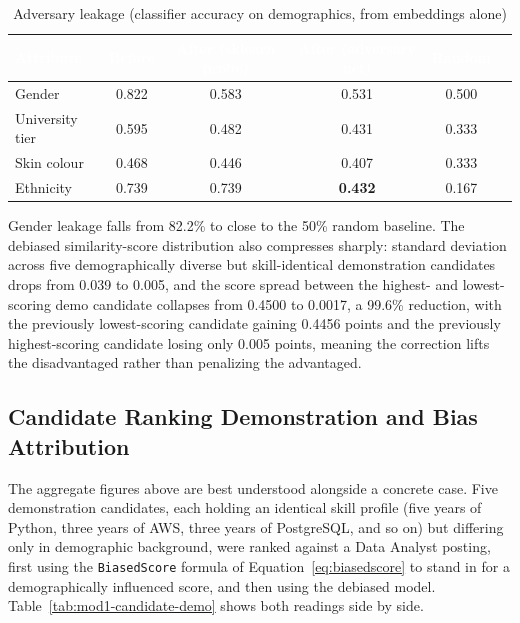 \documentclass[11pt,a4paper]{article}
\newcommand{\hdrow}{\rowcolor{TPnavy}}
\newcommand{\hdtxt}[1]{\textcolor{white}{\bfseries #1}}
\newcommand{\code}[1]{\texttt{\footnotesize #1}}
\begin{document}
\begin{table}[H]
\centering
\caption{Adversary leakage (classifier accuracy on demographics, from embeddings alone)}
\label{tab:mod1-leakage}
\small
\begin{tabular}{lccccc}
\toprule
\hdrow \hdtxt{Attribute} & \hdtxt{Before} & \hdtxt{After (sklearn probe)} & \hdtxt{After (adversary net)} & \hdtxt{Random} \\
\midrule
Gender & 0.822 & 0.583 & 0.531 & 0.500 \\
\rowcolor{TPlight}
University tier & 0.595 & 0.482 & 0.431 & 0.333 \\
Skin colour & 0.468 & 0.446 & 0.407 & 0.333 \\
\rowcolor{TPlight}
Ethnicity & 0.739 & 0.739 & \textbf{0.432} & 0.167 \\
\bottomrule
\end{tabular}
\end{table}

Gender leakage falls from 82.2\% to close to the 50\% random baseline. The debiased similarity-score distribution also compresses sharply: standard deviation across five demographically diverse but skill-identical demonstration candidates drops from 0.039 to 0.005, and the score spread between the highest- and lowest-scoring demo candidate collapses from 0.4500 to 0.0017, a 99.6\% reduction, with the previously lowest-scoring candidate gaining 0.4456 points and the previously highest-scoring candidate losing only 0.005 points, meaning the correction lifts the disadvantaged rather than penalizing the advantaged.

\subsection{Candidate Ranking Demonstration and Bias Attribution}
\label{sec:mod1-ranking-demo}

The aggregate figures above are best understood alongside a concrete case. Five demonstration candidates, each holding an identical skill profile (five years of Python, three years of AWS, three years of PostgreSQL, and so on) but differing only in demographic background, were ranked against a Data Analyst posting, first using the \code{BiasedScore} formula of Equation~\ref{eq:biasedscore} to stand in for a demographically influenced score, and then using the debiased model. Table~\ref{tab:mod1-candidate-demo} shows both readings side by side.
\end{document}

